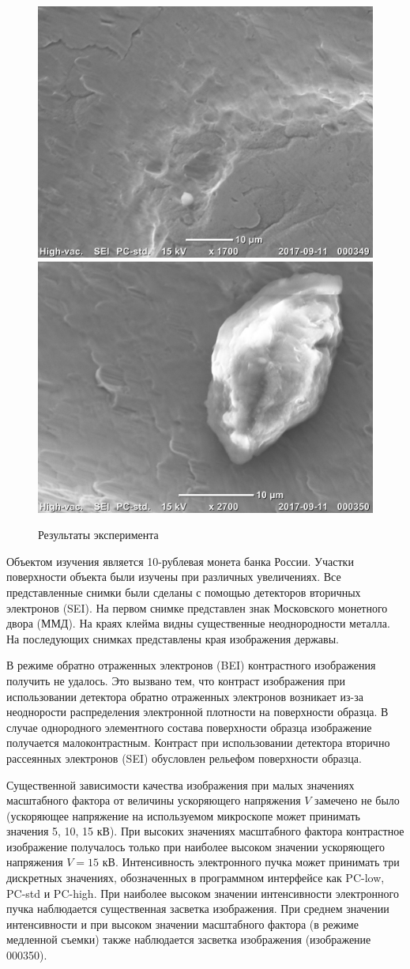 \documentclass[12pt]{article}
\begin{document}
\begin{figure}[!ht]
\includegraphics[width=0.5\linewidth]{pictures/20170911_000349.jpg}
\includegraphics[width=0.5\linewidth]{pictures/20170911_000350.jpg}
\caption{Результаты эксперимента}
\end{figure}

Объектом изучения является 10-рублевая монета банка России. Участки поверхности объекта были изучены при различных увеличениях. Все представленные снимки были сделаны с помощью детекторов вторичных электронов (SEI). На первом снимке представлен знак Московского монетного двора (ММД). На краях клейма видны существенные неоднородности металла. На последующих снимках представлены края изображения державы. \par
В режиме обратно отраженных электронов (BEI) контрастного изображения получить не удалось. Это вызвано тем, что контраст изображения при использовании детектора обратно отраженных электронов  возникает из-за неоднорости распределения электронной плотности на поверхности образца. В случае однородного элементного состава поверхности образца изображение получается малоконтрастным. Контраст при использовании детектора вторично рассеянных электронов (SEI) обусловлен рельефом поверхности образца. \par
Существенной зависимости качества изображения при малых значениях масштабного фактора от величины ускоряющего напряжения $V$ замечено не было (ускоряющее напряжение на используемом микроскопе может принимать значения 5, 10, 15 кВ). При высоких значениях масштабного фактора контрастное изображение получалось только при наиболее высоком значении ускоряющего напряжения $V = 15$ кВ. Интенсивность электронного пучка может принимать три дискретных значениях, обозначенных в программном интерфейсе как PC-low, PC-std и PC-high. При наиболее высоком значении интенсивности электронного пучка наблюдается существенная засветка изображения. При среднем значении интенсивности и при высоком значении масштабного фактора (в режиме медленной съемки) также наблюдается засветка изображения (изображение 000350). 
\end{document}
